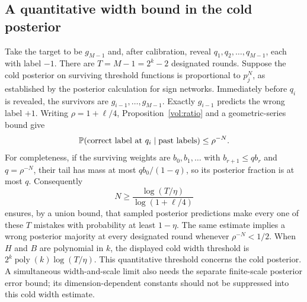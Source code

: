 \subsection{A quantitative width bound in the cold posterior}

Take the target to be $g_{M-1}$ and, after calibration, reveal
$q_1,q_2,\ldots,q_{M-1}$, each with label $-1$.
There are $T=M-1=2^k-2$ designated rounds.
Suppose the cold posterior on surviving threshold functions is proportional
to $p_j^N$, as established by the posterior calculation for sign networks.
Immediately before $q_i$ is revealed, the survivors are
$g_{i-1},\ldots,g_{M-1}$. Exactly $g_{i-1}$ predicts the wrong label $+1$.
Writing $\rho=1+\ell/4$, Proposition~\ref{vol:ratio} and a geometric-series
bound give
\begin{equation}\label{vol:prediction-bound}
 \mathbb P(\text{correct label at }q_i\mid\text{past labels})\le\rho^{-N}.
\end{equation}
For completeness, if the surviving weights are $b_0,b_1,\ldots$ with
$b_{r+1}\le q b_r$ and $q=\rho^{-N}$, their tail has mass at most
$qb_0/(1-q)$, so its posterior fraction is at most $q$.
Consequently
\[
 N\ge\frac{\log(T/\eta)}{\log(1+\ell/4)}
\]
ensures, by a union bound, that sampled posterior predictions make every one
of these $T$ mistakes with probability at least $1-\eta$.
The same estimate implies a wrong posterior majority at every designated
round whenever $\rho^{-N}<1/2$.
When $H$ and $B$ are polynomial in $k$, the displayed cold width threshold is
$2^k\operatorname{poly}(k)\log(T/\eta)$.
This quantitative threshold concerns the cold posterior. A simultaneous
width-and-scale limit also needs the separate finite-scale posterior error
bound; its dimension-dependent constants should not be suppressed into this
cold width estimate.
